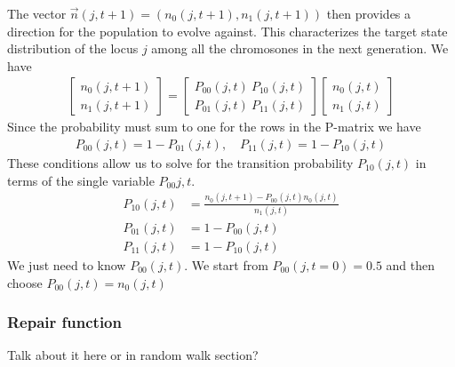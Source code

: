 The vector $\vec{n}(j,t+1)=(n_0(j, t+1), n_1(j, t+1))$ then provides a direction for the population to evolve against. This characterizes the target state distribution of the locus $j$ among all the chromosones in the next generation. We have
\begin{align*}
  \begin{bmatrix}
    n_0(j, t+1) \\
    n_1(j, t+1)
  \end{bmatrix}
  = 
  \begin{bmatrix}
    P_{00}(j,t) \ P_{10}(j,t) \\
    P_{01}(j,t) \ P_{11}(j,t)
  \end{bmatrix}
  \begin{bmatrix}
    n_0(j, t) \\
    n_1(j, t)
  \end{bmatrix}
\end{align*}
Since the probability must sum to one for the rows in the P-matrix we have 
\begin{align*}
  P_{00}(j, t) = 1 - P_{01}(j, t), \quad P_{11}(j, t) = 1 - P_{10}(j, t)
\end{align*}
These conditions allow us to solve for the transition probability $P_{10}(j,t)$ in terms of the single variable $P_{00}{j,t}$.
\begin{align*}
  P_{10}(j,t) &= \frac{n_0(j, t+1) - P_{00}(j,t)n_0(j, t)}{n_1(j,t)} \\
  P_{01}(j,t) &= 1 - P_{00}(j,t) \\
  P_{11}(j,t) &= 1 - P_{10}(j,t)
\end{align*}
We just need to know $P_{00}(j,t)$. We start from $P_{00}(j, t = 0) = 0.5$ and then choose $P_{00}(j,t) = n_0(j,t)$




\subsubsection{Repair function}
Talk about it here or in random walk section?